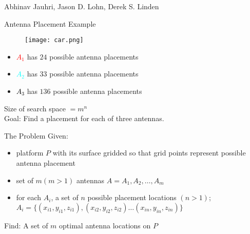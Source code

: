\documentclass{beamer}
\begin{document}
\begin{frame}[plain]
    \vspace{30px}
    \begin{center}
        \Large Abhinav Jauhri, Jason D. Lohn, Derek S. Linden
    \end{center}
\end{frame}

\begin{frame}[t]{Antenna Placement Example}
\begin{figure}
    \centering
    \texttt{[image: car.png]}
\end{figure}
\begin{itemize}
    \item \textcolor{red}{$A_1$} has $24$ possible antenna placements
    \item \textcolor{cyan}{$A_2$} has $33$ possible antenna placements
    \item \textcolor{black}{$A_3$} has $136$ possible antenna placements
\end{itemize}
Size of search space $= m^n$\\
\small Goal: Find a placement for each of three antennas.
\end{frame}

\begin{frame}[t]{The Problem}
    Given:
\begin{itemize} \itemsep1.5em
        \item platform $P$ with its surface gridded so that grid points represent possible antenna placement
        \item set of  $m (m > 1)$ antennas $A = {A_1, A_2, \dots, A_m}$
        \item for each $A_i$, a set of $n$ possible placement locations $(n>1)$; $A_i = \{(x_{i1}, y_{i1}, z_{i1}), (x_{i2}, y_{i2}, z_{i2}) \dots (x_{in}, y_{in}, z_{in})\}$
    \end{itemize}
\vspace{10px}
    Find: A set of $m$ optimal antenna locations on $P$
\end{frame}
\end{document}
